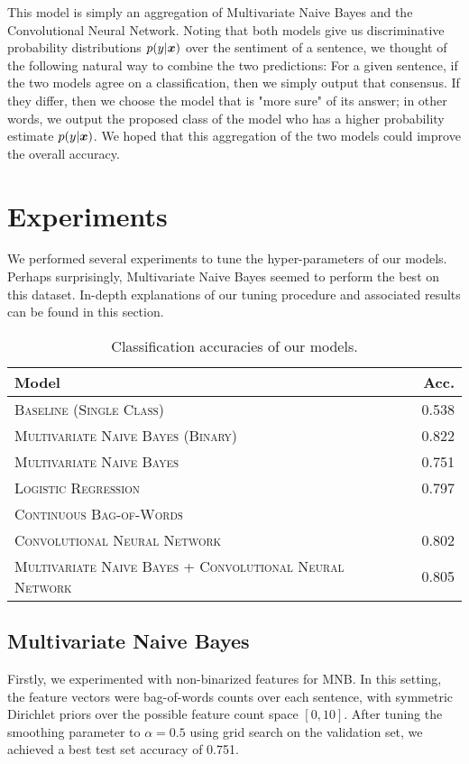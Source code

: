 \documentclass[11pt]{article}
\begin{document}
This model is simply an aggregation of Multivariate Naive Bayes and the Convolutional Neural Network.  Noting that both models give us discriminative probability distributions $p(y \vert \boldsymbol{x})$ over the sentiment of a sentence, we thought of the following natural way to combine the two predictions: For a given sentence, if the two models agree on a classification, then we simply output that consensus.  If they differ, then we choose the model that is "more sure" of its answer; in other words, we output the proposed class of the model who has a higher probability estimate $p(y \vert \boldsymbol{x})$.  We hoped that this aggregation of the two models could improve the overall accuracy.   
\section{Experiments}

We performed several experiments to tune the hyper-parameters of our models.  Perhaps surprisingly, Multivariate Naive Bayes seemed to perform the best on this dataset.  In-depth explanations of our tuning procedure and associated results can be found in this section.

\begin{table}[H]
\centering
\begin{tabular}{llr}
 \toprule
 Model &  & Acc. \\
 \midrule
 \textsc{Baseline (Single Class)} & & 0.538\\
 \textsc{Multivariate Naive Bayes (Binary)} & & 0.822 \\
 \textsc{Multivariate Naive Bayes} & & 0.751 \\
 \textsc{Logistic Regression} & & 0.797 \\
 \textsc{Continuous Bag-of-Words} & & \\
 \textsc{Convolutional Neural Network} & & 0.802 \\
 \textsc{Multivariate Naive Bayes + Convolutional Neural Network}  & & 0.805 \\
 \bottomrule 
\end{tabular}
\caption{\label{tab:results} Classification accuracies of our models.}
\end{table}

\subsection{Multivariate Naive Bayes} 
Firstly, we experimented with non-binarized features for MNB. In this setting, the feature vectors were bag-of-words counts over each sentence, with symmetric Dirichlet priors over the possible feature count space $[0, 10]$. After tuning the smoothing parameter to $\alpha = 0.5$ using grid search on the validation set, we achieved a best test set accuracy of 0.751. 
\end{document}
